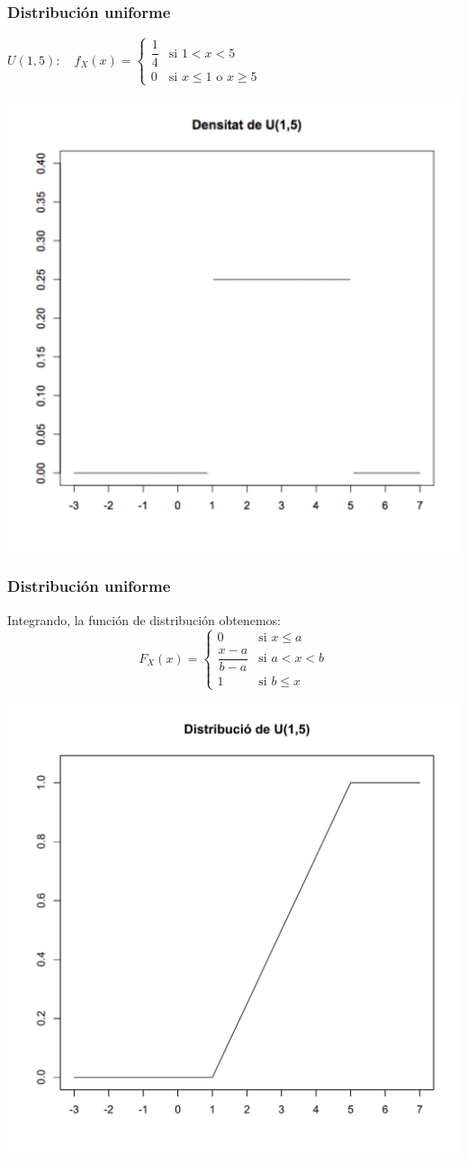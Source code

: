 \documentclass[handout]{beamer}\usepackage[]{graphicx}\usepackage[]{color}
\renewcommand{\leq}{\leqslant}
\renewcommand{\geq}{\geqslant}
\theoremstyle{plain}
\theoremstyle{definition}
\begin{document}
\begin{frame} 
\frametitle{Distribución uniforme}
 $U(1,5):\quad f_X(x)=
 \left\{\begin{array}{ll}
\dfrac{1}{4} & \mbox{si } 1<x<5\\[2ex] 0  & \mbox{si $x\leq 1$ o $x\geq 5$}
\end{array}
\right. $

\begin{center}
\includegraphics[width=0.6\linewidth]{dunif15}
\end{center}



\end{frame}


 
\begin{frame} 
\frametitle{Distribución uniforme}
\vspace*{-1ex}

Integrando, la función de distribución obtenemos:
$$
F_X(x)=\left\{\begin{array}{ll} 0  & \mbox{si } x\leq a\\
\dfrac{x-a}{b-a} & \mbox{si } a<x<b\\ 1  & \mbox{si } b\leq x
\end{array}
\right. 
$$
\vspace*{-3ex}

\begin{center}
\includegraphics[width=0.625\linewidth]{punif15}
\end{center}



\end{frame}
\end{document}
